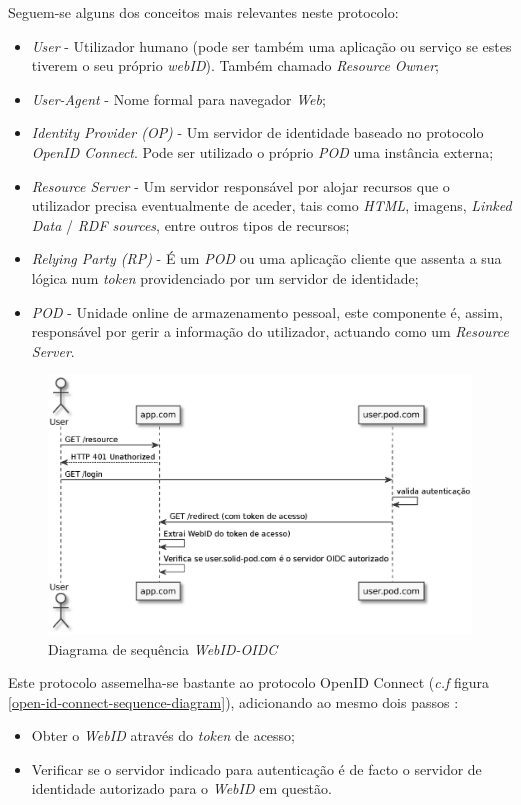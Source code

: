 Seguem-se alguns dos conceitos mais relevantes neste protocolo:
\begin{itemize}
    \item \emph{User} - Utilizador humano (pode ser também uma aplicação ou serviço se estes tiverem o seu próprio \emph{webID}). Também chamado \emph{Resource Owner};
    \item \emph{User-Agent} - Nome formal para navegador \emph{Web};
    \item \emph{Identity Provider (OP)} - Um servidor de identidade baseado no protocolo \emph{OpenID Connect}. Pode ser utilizado o próprio \emph{\acrshort{POD}} uma instância externa;
    \item \emph{Resource Server} - Um servidor responsável por alojar recursos que o utilizador precisa eventualmente de aceder, tais como \emph{HTML}, imagens, \emph{Linked Data} / \emph{RDF sources}, entre outros tipos de recursos;
    \item \emph{Relying Party (RP)} - É um \emph{\acrshort{POD}} ou uma aplicação cliente que assenta a sua lógica num \emph{token} providenciado por um servidor de identidade;
    \item \emph{\acrshort{POD}} - Unidade online de armazenamento pessoal, este componente é, assim, responsável por gerir a informação do utilizador, actuando como um \emph{Resource Server}.
\end{itemize}

\begin{figure}[H]
    \centering
    \includegraphics[width=0.8 \textwidth]{figures/WebId-OIDC}
    \caption{Diagrama de sequência \emph{WebID-OIDC}}
    \label{web-id-oidc-sequence-diagram}
\end{figure}

Este protocolo assemelha-se bastante ao protocolo OpenID Connect (\emph{c.f} figura \ref{open-id-connect-sequence-diagram}), adicionando ao mesmo dois passos \cite{solid_webid_oidc}:
\begin{itemize}
    \item Obter o \emph{WebID} através do \emph{token} de acesso;
    \item Verificar se o servidor indicado para autenticação é de facto o servidor de identidade autorizado para o \emph{WebID} em questão.
\end{itemize}

